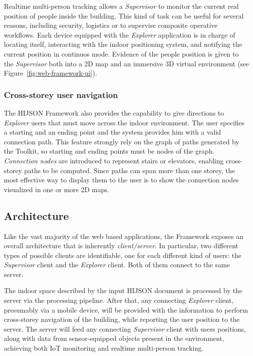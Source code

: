 Realtime multi-person tracking allows a \emph{Supervisor} to monitor the current
real position of people inside the building. This kind of task can be useful for
several reasons, including security, logistics or to supervise composite operative
workflows. Each device equipped with the \emph{Explorer} application is in charge of locating
itself, interacting with the indoor positioning system, and notifying the current
position in continuos mode. Evidence of the people position is given to the
\emph{Supervisor} both into a 2D map and an immersive 3D virtual environment (see Figure~\ref{fig:web-framework-ui}).

\subsubsection{Cross-storey user navigation}\label{cross-storey-user-navigation}

The HIJSON Framework also provides the capability to give directions to
\emph{Explorer} users that must move across the indoor environment. The user
specifies a starting and an ending point and the system provides him with a
valid connection path. This feature strongly rely on the graph of paths
generated by the Toolkit, so starting and ending points must be nodes of the
graph. \emph{Connection nodes} are introduced to represent stairs or
elevators, enabling cross-storey paths to be computed. Since paths can span
more than one storey, the most effective way to display them to the user is to
show the connection nodes visualized in one or more 2D maps.

\subsection{Architecture}\label{architecture}

Like the vast majority of the web based applications, the Framework exposes an
overall architecture that is inherently \emph{client/server}. In particular,
two different types of possible clients are identifiable, one for each different 
kind of users: the \emph{Supervisor} client and the \emph{Explorer} client. 
Both of them connect to the same server.

The indoor space described by the input HIJSON document is
processed by the server via the processing pipeline. After that, any connecting
\emph{Explorer} client, presumably via a mobile device, will be provided
with the information to perform cross-storey navigation of the building, while
reporting the user position to the server. The server will feed any connecting
\emph{Supervisor} client with users positions, along with data from sensor-equipped 
objects present in the environment, achieving both IoT monitoring and 
realtime multi-person tracking.


